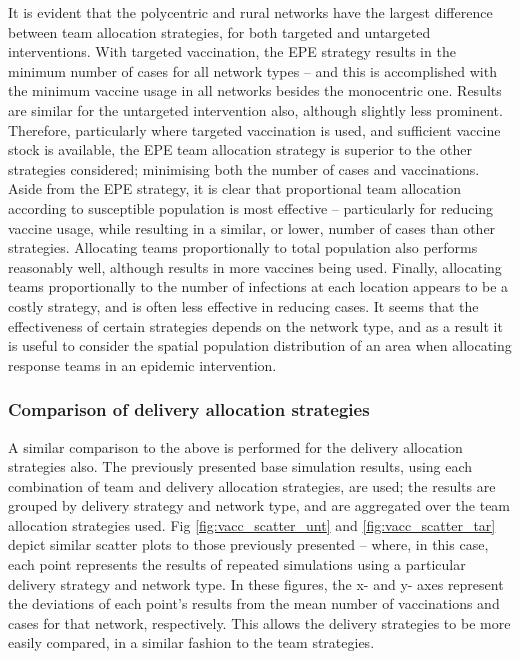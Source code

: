 \documentclass[10pt,letterpaper]{article}
\begin{document}
It is evident that the polycentric and rural networks have the largest difference between team allocation strategies, for both targeted and untargeted interventions. With targeted vaccination, the EPE strategy results in the minimum number of cases for all network types -- and this is accomplished with the minimum vaccine usage in all networks besides the monocentric one. Results are similar for the untargeted intervention also, although slightly less prominent. Therefore, particularly where targeted vaccination is used, and sufficient vaccine stock is available, the EPE team allocation strategy is superior to the other strategies considered; minimising both the number of cases and vaccinations.
Aside from the EPE strategy, it is clear that proportional team allocation according to susceptible population is most effective -- particularly for reducing vaccine usage, while resulting in a similar, or lower, number of cases than other strategies. Allocating teams proportionally to total population also performs reasonably well, although results in more vaccines being used. Finally, allocating teams proportionally to the number of infections at each location appears to be a costly strategy, and is often less effective in reducing cases. It seems that the effectiveness of certain strategies depends on the network type, and as a result it is useful to consider the spatial population distribution of an area when allocating response teams in an epidemic intervention.

\subsubsection*{Comparison of delivery allocation strategies}
A similar comparison to the above is performed for the delivery allocation strategies also. The previously presented base simulation results, using each combination of team and delivery allocation strategies, are used; the results are grouped by delivery strategy and network type, and are aggregated over the team allocation strategies used. Fig \ref{fig:vacc_scatter_unt} and \ref{fig:vacc_scatter_tar} depict similar scatter plots to those previously presented -- where, in this case, each point represents the results of repeated simulations using a particular delivery strategy and network type. In these figures, the x- and y- axes represent the deviations of each point's results from the mean number of vaccinations and cases for that network, respectively. This allows the delivery strategies to be more easily compared, in a similar fashion to the team strategies.
\end{document}
